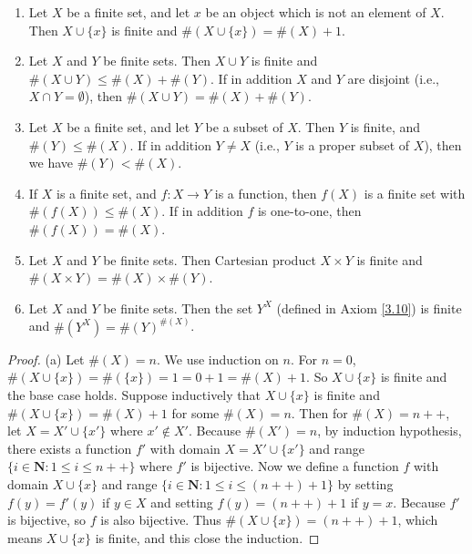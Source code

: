\begin{proposition}\label{3.6.14}
\leavevmode
\begin{enumerate}
    \item Let \(X\) be a finite set, and let \(x\) be an object which is not an element of \(X\).
    Then \(X \cup \{x\}\) is finite and \(\#(X \cup \{x\}) = \#(X) + 1\).
    \item Let \(X\) and \(Y\) be finite sets.
    Then \(X \cup Y\) is finite and \(\#(X \cup Y) \leq \#(X) + \#(Y)\).
    If in addition \(X\) and \(Y\) are disjoint (i.e., \(X \cap Y = \emptyset\)), then \(\#(X \cup Y) = \#(X) + \#(Y)\).
    \item Let \(X\) be a finite set, and let \(Y\) be a subset of \(X\).
    Then \(Y\) is finite, and \(\#(Y) \leq \#(X)\).
    If in addition \(Y \neq X\) (i.e., \(Y\) is a proper subset of \(X\)), then we have \(\#(Y) < \#(X)\).
    \item If \(X\) is a finite set, and \(f : X \to Y\) is a function, then \(f(X)\) is a finite set with \(\#(f(X)) \leq \#(X)\).
    If in addition \(f\) is one-to-one, then \(\#(f(X)) = \#(X)\).
    \item Let \(X\) and \(Y\) be finite sets.
    Then Cartesian product \(X \times Y\) is finite and \(\#(X \times Y) = \#(X) \times \#(Y)\).
    \item Let \(X\) and \(Y\) be finite sets.
    Then the set \(Y^X\) (defined in Axiom \ref{3.10}) is finite and \(\#(Y^X) = \#(Y)^{\#(X)}\).
\end{enumerate}
\end{proposition}

\begin{proof}{(a)}
Let \(\#(X) = n\).
We use induction on \(n\).
For \(n = 0\), \(\#(X \cup \{x\}) = \#(\{x\}) = 1 = 0 + 1 = \#(X) + 1\).
So \(X \cup \{x\}\) is finite and the base case holds.
Suppose inductively that \(X \cup \{x\}\) is finite and \(\#(X \cup \{x\}) = \#(X) + 1\) for some \(\#(X) = n\).
Then for \(\#(X) = n++\), let \(X = X' \cup \{x'\}\) where \(x' \notin X'\).
Because \(\#(X') = n\), by induction hypothesis, there exists a function \(f'\) with domain \(X = X' \cup \{x'\}\) and range \(\{i \in \mathbf{N} : 1 \leq i \leq n++\}\) where \(f'\) is bijective.
Now we define a function \(f\) with domain \(X \cup \{x\}\) and range \(\{i \in \mathbf{N} : 1 \leq i \leq (n++) + 1\}\) by setting \(f(y) = f'(y)\) if \(y \in X\) and setting \(f(y) = (n++) + 1\) if \(y = x\).
Because \(f'\) is bijective, so \(f\) is also bijective.
Thus \(\#(X \cup \{x\}) = (n++) + 1\), which means \(X \cup \{x\}\) is finite, and this close the induction.
\end{proof}


